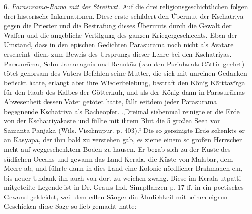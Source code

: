 \documentclass{article}
\begin{document}
6. \emph{Parasurama-R\={a}ma mit der Streitaxt.} Auf die drei religionsgeschichtlichen folgen drei historische Inkarnationen. Diese erste schildert den Übermut der Kschatriya gegen die Priester und die Bestrafung dieses Übermuts durch die Gewalt der Waffen und die angebliche Vertilgung des ganzen Kriegergeschlechts. Eben der Umstand, dass in den epischen Gedichten Parasur\={a}ma noch nicht als Avat\={a}re erscheint, dient zum Beweis des Ursprungs dieser Lehre bei den Kschatriyas. Parasur\={a}ma, Sohn Jamadagnis und Renuk\={a}s (von den Pariahs als Göttin geehrt) tötet gehorsam des Vaters Befehlen seine Mutter, die sich mit unreinen Gedanken befleckt hatte, erlangt aber ihre Wiederbelebung, bestraft den König K\={a}rttav\={i}rga für den Raub des Kalbes der Götterkuh, und als der König dann in Parasur\={a}mas Abwesenheit dessen Vater getötet hatte, fällt seitdem jeder Parasur\={a}ma begegnende Kschatriya als Racheopfer. „Dreimal siebenmal reinigte er die Erde von der Kschatriyakaste und füllte mit ihrem Blut die 5 großen Seen von Samanta Panjaka (Wils. Vischnupur. p. 403).“ Die so gereinigte Erde schenkte er an Kasyapa, der ihm bald zu verstehen gab, es zieme einem so großen Herrscher nicht auf weggeschenktem Boden zu hausen. Er begab sich zu der Küste des südlichen Oceans und gewann das Land Kerala, die Küste von Malabar, dem Meere ab, und führte dann in dies Land eine Kolonie nördlicher Brahmanen ein, bis neuer Undank ihn auch von dort zu weichen zwang. Diese im Kerala-utpatti mitgeteilte Legende ist in Dr. Grauls Ind. Sinnpflanzen p. 17 ff. in ein poetisches Gewand gekleidet, weil dem edlen Sänger die Ähnlichkeit mit seinen eignen Geschicken diese Sage so lieb gemacht hatte:
\end{document}
